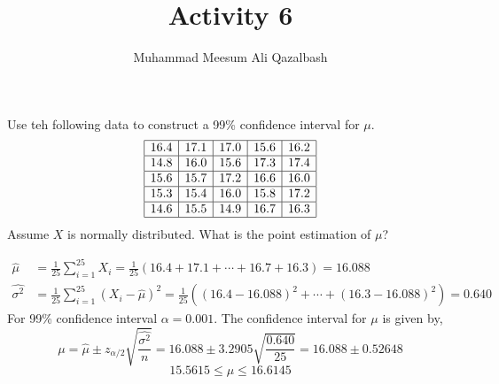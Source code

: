 \documentclass{exam}
\title{Activity 6}
\author{Muhammad Meesum Ali Qazalbash}
\theoremstyle{mytheoremstyle}
\theoremstyle{mytheoremstyle}
\theoremstyle{myproblemstyle}
\begin{document}
\maketitle
\begin{questions}
    \question Use teh following data to construct a 99\% confidence interval for \(\mu\).
    \begin{align*}
        \begin{array}{|c|c|c|c|c|}
            \hline
            16.4 & 17.1 & 17.0 & 15.6 & 16.2 \\\hline
            14.8 & 16.0 & 15.6 & 17.3 & 17.4 \\\hline
            15.6 & 15.7 & 17.2 & 16.6 & 16.0 \\\hline
            15.3 & 15.4 & 16.0 & 15.8 & 17.2 \\\hline
            14.6 & 15.5 & 14.9 & 16.7 & 16.3 \\\hline
        \end{array}
    \end{align*}
    Assume \(X\) is normally distributed. What is the point estimation of \(\mu\)?
    \begin{solution}
        \begin{align*}
            \hat{\mu}        & = \frac{1}{25} \sum_{i=1}^{25} X_i = \frac{1}{25} \left( 16.4 + 17.1 + \cdots + 16.7 + 16.3 \right) = \boxed{16.088}                     \\
            \hat{\sigma^{2}} & = \frac{1}{25} \sum_{i=1}^{25} (X_i - \hat{\mu})^2 = \frac{1}{25} \left( (16.4 - 16.088)^2 + \cdots  + (16.3 - 16.088)^2 \right) = 0.640
        \end{align*}
        For 99\% confidence interval \(\alpha=0.001\). The confidence interval for \(\mu\) is given by,
        \[
            \mu=\hat{\mu} \pm z_{\alpha/2} \sqrt{\frac{\hat{\sigma^{2}}}{n}} = 16.088 \pm 3.2905 \sqrt{\frac{0.640}{25}} = 16.088 \pm 0.52648
        \]
        \[\boxed{15.5615\le \mu\le 16.6145}\]


    \end{solution}

    \newpage


\end{questions}
\end{document}
